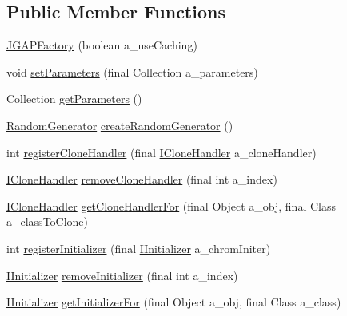 \subsection*{Public Member Functions}
\begin{DoxyCompactItemize}
\item 
\hyperlink{classorg_1_1jgap_1_1impl_1_1_j_g_a_p_factory_ad7be006e79eaaf186cdd492d6a5b506d}{J\-G\-A\-P\-Factory} (boolean a\-\_\-use\-Caching)
\item 
void \hyperlink{classorg_1_1jgap_1_1impl_1_1_j_g_a_p_factory_a13f1f864e9a8b7397acba6e5bac0399a}{set\-Parameters} (final Collection a\-\_\-parameters)
\item 
Collection \hyperlink{classorg_1_1jgap_1_1impl_1_1_j_g_a_p_factory_a148436410282e80441a93b5d4a5ece03}{get\-Parameters} ()
\item 
\hyperlink{interfaceorg_1_1jgap_1_1_random_generator}{Random\-Generator} \hyperlink{classorg_1_1jgap_1_1impl_1_1_j_g_a_p_factory_aa19abf4aa447b599442aff5205ea54fb}{create\-Random\-Generator} ()
\item 
int \hyperlink{classorg_1_1jgap_1_1impl_1_1_j_g_a_p_factory_a118f76c46546ece81c79be945f329275}{register\-Clone\-Handler} (final \hyperlink{interfaceorg_1_1jgap_1_1_i_clone_handler}{I\-Clone\-Handler} a\-\_\-clone\-Handler)
\item 
\hyperlink{interfaceorg_1_1jgap_1_1_i_clone_handler}{I\-Clone\-Handler} \hyperlink{classorg_1_1jgap_1_1impl_1_1_j_g_a_p_factory_a279e020de99aaa211b21b17b271df845}{remove\-Clone\-Handler} (final int a\-\_\-index)
\item 
\hyperlink{interfaceorg_1_1jgap_1_1_i_clone_handler}{I\-Clone\-Handler} \hyperlink{classorg_1_1jgap_1_1impl_1_1_j_g_a_p_factory_a17928994201f3445564d95de57455eb4}{get\-Clone\-Handler\-For} (final Object a\-\_\-obj, final Class a\-\_\-class\-To\-Clone)
\item 
int \hyperlink{classorg_1_1jgap_1_1impl_1_1_j_g_a_p_factory_af215f164a1523018d126b3abdf87cf97}{register\-Initializer} (final \hyperlink{interfaceorg_1_1jgap_1_1_i_initializer}{I\-Initializer} a\-\_\-chrom\-Initer)
\item 
\hyperlink{interfaceorg_1_1jgap_1_1_i_initializer}{I\-Initializer} \hyperlink{classorg_1_1jgap_1_1impl_1_1_j_g_a_p_factory_a9eb22c3e67b7f1e9b19e045833097850}{remove\-Initializer} (final int a\-\_\-index)
\item 
\hyperlink{interfaceorg_1_1jgap_1_1_i_initializer}{I\-Initializer} \hyperlink{classorg_1_1jgap_1_1impl_1_1_j_g_a_p_factory_a59a3adb9b865d4059c955f9695639c31}{get\-Initializer\-For} (final Object a\-\_\-obj, final Class a\-\_\-class)

\end{DoxyCompactItemize}
